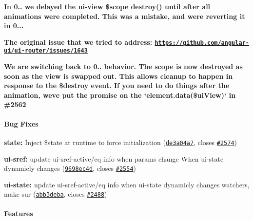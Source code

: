{\bfseries {\bfseries }}

{\bfseries {\bfseries In 0.. we delayed the ui-\/view \$scope destroy() until after all animations were completed. This was a mistake, and we\textquotesingle{}re reverting it in 0...}}

{\bfseries {\bfseries The original issue that we tried to address\+: \href{https://github.com/angular-ui/ui-router/issues/1643}{\tt https\+://github.\+com/angular-\/ui/ui-\/router/issues/1643}}}

{\bfseries {\bfseries We are switching back to 0.. behavior. The scope is now destroyed as soon as the view is swapped out. This allows cleanup to happen in response to the \$destroy event. If you need to do things after the animation, we\textquotesingle{}ve put the promise on the `element.data(\textquotesingle{}\$ui\+View\textquotesingle{})` in \#2562}}

{\bfseries {\bfseries \paragraph*{Bug Fixes}}}

{\bfseries {\bfseries }}

{\bfseries {\bfseries 
\begin{DoxyItemize}
\item {\bfseries state\+:} Inject \$state at runtime to force initialization (\href{https://github.com/angular-ui/ui-router/commit/de3a04a7c676e05b5b868de4f65d03d9c588773c}{\tt de3a04a7}, closes \href{https://github.com/angular-ui/ui-router/issues/2574}{\tt \#2574})
\item {\bfseries ui-\/sref\+:} update ui-\/sref-\/active/eq info when params change When ui-\/state dynamicly changes (\href{https://github.com/angular-ui/ui-router/commit/9698ec4d2fbceb463cf11e43b7e74e385eda4beb}{\tt 9698ec4d}, closes \href{https://github.com/angular-ui/ui-router/issues/2554}{\tt \#2554})
\item {\bfseries ui-\/state\+:} update ui-\/sref-\/active/eq info when ui-\/state dynamicly changes watchers, make sur (\href{https://github.com/angular-ui/ui-router/commit/abb3debacb87e1a6c398a13f2d64c53e8b08a233}{\tt abb3deba}, closes \href{https://github.com/angular-ui/ui-router/issues/2488}{\tt \#2488})
\end{DoxyItemize}}}

{\bfseries {\bfseries \paragraph*{Features}}}

